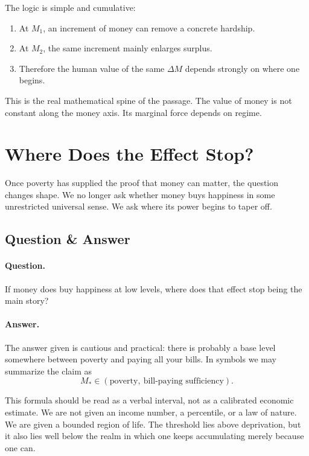 The logic is simple and cumulative:
\begin{enumerate}
\item At \(M_1\), an increment of money can remove a concrete hardship.
\item At \(M_2\), the same increment mainly enlarges surplus.
\item Therefore the human value of the same \(\Delta M\) depends strongly on where one begins.
\end{enumerate}

This is the real mathematical spine of the passage. The value of money is not constant along the money axis. Its marginal force depends on regime.

\section{Where Does the Effect Stop?}

Once poverty has supplied the proof that money can matter, the question changes shape. We no longer ask whether money buys happiness in some unrestricted universal sense. We ask where its power begins to taper off.

\subsection{Question \& Answer}

\paragraph{Question.}
If money does buy happiness at low levels, where does that effect stop being the main story?

\paragraph{Answer.}
The answer given is cautious and practical: there is probably a base level somewhere between poverty and paying all your bills. In symbols we may summarize the claim as
\begin{equation}
M_* \in (\text{poverty},\ \text{bill-paying sufficiency}).
\end{equation}

This formula should be read as a verbal interval, not as a calibrated economic estimate. We are not given an income number, a percentile, or a law of nature. We are given a bounded region of life. The threshold lies above deprivation, but it also lies well below the realm in which one keeps accumulating merely because one can.

